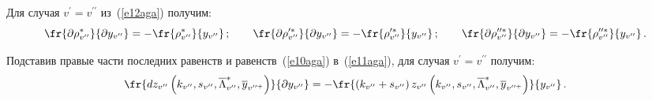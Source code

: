    Для случая $v^\prime=v^{\prime\prime}$ из~(\ref{e12aga}) получим:
   $$
   \fr{\partial \rho_{v^{\prime\prime}}^*}{\partial y_{v^{\prime\prime}}}=-
\fr{\rho^*_{v^{\prime\prime}}}{y_{v^{\prime\prime}}}\,;\qquad 
   \fr{\partial \rho_{v^{\prime\prime}}^{\prime *}}
   {\partial y_{v^{\prime\prime}}}=
   -\fr{\rho^{\prime *}_{v^{\prime\prime}}}{y_{v^{\prime\prime}}}\,;\qquad
   \fr{\partial \rho^{\prime\prime *}_{v^{\prime\prime}}}
   {\partial y_{v^{\prime\prime}}}=-
   \fr{\rho_{v^{\prime\prime}}^{\prime\prime *}}
   {y_{v^{\prime\prime}}}\,.
   $$
   
   Подставив правые части последних равенств и равенств~(\ref{e10aga}) 
в~(\ref{e11aga}), для случая $v^\prime=v^{\prime\prime}$ получим:
   \begin{equation}
   \fr{dz_{ v^{\prime\prime}}\left(k_{ v^{\prime\prime}}, s_{ v^{\prime\prime}}, 
\overline{\Lambda}^*_{ v^{\prime\prime}}, \overline{y}_{ v^{\prime\prime 
+}}\right)}{\partial y_{ v^{\prime\prime}}}=
-\fr{\left(k_{ v^{\prime\prime}}+s_{ 
v^{\prime\prime}}\right)z_{ v^{\prime\prime}}\left(k_{ v^{\prime\prime}}, 
s_{v^{\prime\prime}}, \overline{\Lambda}^*_{ v^{\prime\prime}}, \overline{y}_{ 
v^{\prime\prime +}}\right)}{y_{ v^{\prime\prime}}}\,.
   \label{e14aga}
   \end{equation}
   
